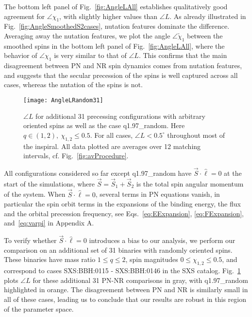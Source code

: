 \documentclass[aps,prd,amsmath,floatfix,twocolumn,superscriptaddress,nofootinbib,showpacs]{revtex4-1}
\newcommand{\ellHat}{\ensuremath{\hat{\ell}}}
\begin{document}
The bottom left panel of Fig.~\ref{fig:AngleLAll} establishes
qualitatively good agreement for $\angle\chi_1$, with slightly higher
values than $\angle L$.  As already illustrated in
Fig.~\ref{fig:AngleSmoothedS2cases}, nutation features dominate the
difference.  Averaging away the nutation features, we plot the angle
$\angle \tilde{\chi}_{1}$ between the smoothed spins in the bottom
left panel of Fig.~\ref{fig:AngleLAll}, where the behavior of $\angle
\chi_{1}$ is very similar to that of $\angle L$.  This confirms that
the main disagreement between PN and NR spin dynamics comes from
nutation features, and suggests that the secular precession of the
spins is well captured across all cases, whereas the nutation of the
spins is not.


\begin{figure}
  \centering
  \texttt{[image: AngleLRandom31]}
  \caption{  \label{fig:AngleLRandom31}
    $\angle L$ for additional 31 precessing configurations with
    arbitrary oriented spins as well as the case q1.97\_random. Here
    $q\in(1,2),\ \chi_{1,2}\le 0.5$. For all cases, $\angle L <
    0.5^{\circ}$ throughout most of the inspiral.
  All data plotted
    are averages over 12 matching intervals,
    cf. Fig.~\ref{fig:avProcedure}.}
\end{figure}


All configurations considered so far except q1.97\_random have
$\vec{S}\cdot\ellHat=0$ at the start of the simulations, where $\vec
S=\vec S_1+\vec S_2$ is the total spin angular momentum of the
system.  When $\vec{S}\cdot\ellHat=0$, several terms in PN equations
vanish, in particular the spin orbit terms in the expansions of the
binding energy, the flux and the orbital precession frequency, see
Eqs.~\eqref{eq:EExpansion}, \eqref{eq:FExpansion},
and~\eqref{eq:varpi} in Appendix A.

To verify whether $\vec{S}\cdot\ellHat=0$ introduces a bias to our
analysis, we perform our comparison on an additional set of 31
binaries with randomly oriented spins. These binaries have mass ratio
$1\le q \le 2$, spin magnitudes $0\le\chi_{1,2}\le0.5$, and correspond
to cases SXS:BBH:0115 - SXS:BBH:0146 in the SXS
catalog. Fig.~\ref{fig:AngleLRandom31} plots $\angle L$ for these
additional 31 PN-NR comparisons in gray, with q1.97\_random
highlighted in orange. The disagreement between PN and NR is similarly
small in all of these cases, leading us to conclude that our results
are robust in this region of the parameter space.
\end{document}
